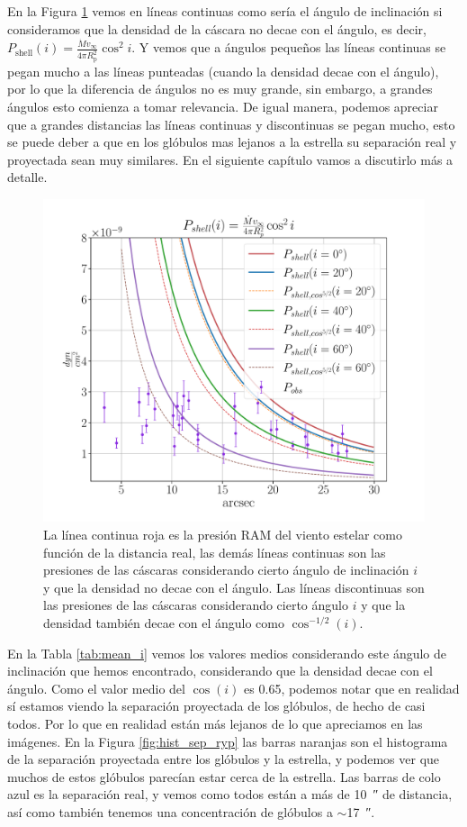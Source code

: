 \documentclass{book}
\begin{document}
En la Figura \ref{fig:ncos_2} vemos en líneas continuas como sería el ángulo de inclinación si consideramos que la densidad de la cáscara no decae con el ángulo, es decir, $P_\mathrm{shell}(i)=\frac{\dot{M}v_\infty}{4\pi R_\mathrm{p}^2}\cos^2i$. Y vemos que a ángulos pequeños las líneas continuas se pegan mucho a las líneas punteadas (cuando la densidad decae con el ángulo), por lo que la diferencia de ángulos no es muy grande, sin embargo, a grandes ángulos esto comienza a tomar relevancia. De igual manera, podemos apreciar que a grandes distancias las líneas continuas y discontinuas se pegan mucho, esto se puede deber a que en los glóbulos mas lejanos a la estrella su separación real y proyectada sean muy similares. En el siguiente capítulo vamos a discutirlo más a detalle.

\begin{figure}[htb]
    \centering
    \includegraphics[width=\textwidth]{ultimos/R_1_cos2(1).pdf}
    \caption{La línea continua roja es la presión RAM del viento estelar como función de la distancia real, las demás líneas continuas son las presiones de las cáscaras considerando cierto ángulo de inclinación $i$ y que la densidad no decae con el ángulo. Las líneas discontinuas son las presiones de las cáscaras considerando cierto ángulo $i$ y que la densidad también decae con el ángulo como $\cos^{-1/2}(i)$.}
    \label{fig:ncos_2}
\end{figure}

En la Tabla \ref{tab:mean_i} vemos los valores medios considerando este ángulo de inclinación que hemos encontrado, considerando que la densidad decae con el ángulo. Como el valor medio del $\cos(i)$ es 0.65, podemos notar que en realidad sí estamos viendo la separación proyectada de los glóbulos, de hecho de casi todos. Por lo que en realidad están más lejanos de lo que apreciamos en las imágenes. En la Figura \ref{fig:hist_sep_ryp} las barras naranjas son el histograma de la separación proyectada entre los glóbulos y la estrella, y podemos ver que muchos de estos glóbulos parecían estar cerca de la estrella. Las barras de colo azul es la separación real, y vemos como todos están a más de \SI{10}{\arcsecond} de distancia, así como también tenemos una concentración de glóbulos a $\sim$\SI{17}{\arcsecond}.
\end{document}
